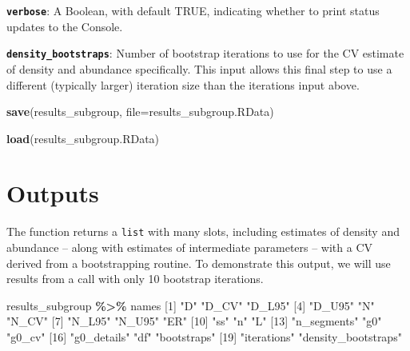 \documentclass[
]{book}
\newenvironment{Shaded}{\begin{snugshade}}{\end{snugshade}}
\newcommand{\AttributeTok}[1]{\textcolor[rgb]{0.13,0.29,0.53}{#1}}
\newcommand{\DecValTok}[1]{\textcolor[rgb]{0.00,0.00,0.81}{#1}}
\newcommand{\FunctionTok}[1]{\textcolor[rgb]{0.13,0.29,0.53}{\textbf{#1}}}
\newcommand{\NormalTok}[1]{#1}
\newcommand{\SpecialCharTok}[1]{\textcolor[rgb]{0.81,0.36,0.00}{\textbf{#1}}}
\newcommand{\StringTok}[1]{\textcolor[rgb]{0.31,0.60,0.02}{#1}}
\begin{document}
\textbf{\texttt{verbose}}: A Boolean, with default TRUE, indicating whether to print status updates to the Console.

\textbf{\texttt{density\_bootstraps}}: Number of bootstrap iterations to use for the CV estimate of density and abundance specifically. This input allows this final step to use a different (typically larger) iteration size than the iterations input above.

\begin{Shaded}
\begin{Highlighting}[]
\FunctionTok{save}\NormalTok{(results\_subgroup, }\AttributeTok{file=}\StringTok{\textquotesingle{}results\_subgroup.RData\textquotesingle{}}\NormalTok{)}
\end{Highlighting}
\end{Shaded}

\begin{Shaded}
\begin{Highlighting}[]
\FunctionTok{load}\NormalTok{(}\StringTok{\textquotesingle{}results\_subgroup.RData\textquotesingle{}}\NormalTok{)}
\end{Highlighting}
\end{Shaded}

\hypertarget{outputs-1}{%
\section*{Outputs}\label{outputs-1}}

The function returns a \texttt{list} with many slots, including estimates of density and abundance -- along with estimates of intermediate parameters -- with a CV derived from a bootstrapping routine. To demonstrate this output, we will use results from a call with only 10 bootstrap iterations.

\begin{Shaded}
\begin{Highlighting}[]
\NormalTok{results\_subgroup }\SpecialCharTok{\%\textgreater{}\%}\NormalTok{ names}
\NormalTok{ [}\DecValTok{1}\NormalTok{] }\StringTok{"D"}                  \StringTok{"D\_CV"}               \StringTok{"D\_L95"}             
\NormalTok{ [}\DecValTok{4}\NormalTok{] }\StringTok{"D\_U95"}              \StringTok{"N"}                  \StringTok{"N\_CV"}              
\NormalTok{ [}\DecValTok{7}\NormalTok{] }\StringTok{"N\_L95"}              \StringTok{"N\_U95"}              \StringTok{"ER"}                
\NormalTok{[}\DecValTok{10}\NormalTok{] }\StringTok{"ss"}                 \StringTok{"n"}                  \StringTok{"L"}                 
\NormalTok{[}\DecValTok{13}\NormalTok{] }\StringTok{"n\_segments"}         \StringTok{"g0"}                 \StringTok{"g0\_cv"}             
\NormalTok{[}\DecValTok{16}\NormalTok{] }\StringTok{"g0\_details"}         \StringTok{"df"}                 \StringTok{"bootstraps"}        
\NormalTok{[}\DecValTok{19}\NormalTok{] }\StringTok{"iterations"}         \StringTok{"density\_bootstraps"}
\end{Highlighting}
\end{Shaded}
\end{document}
